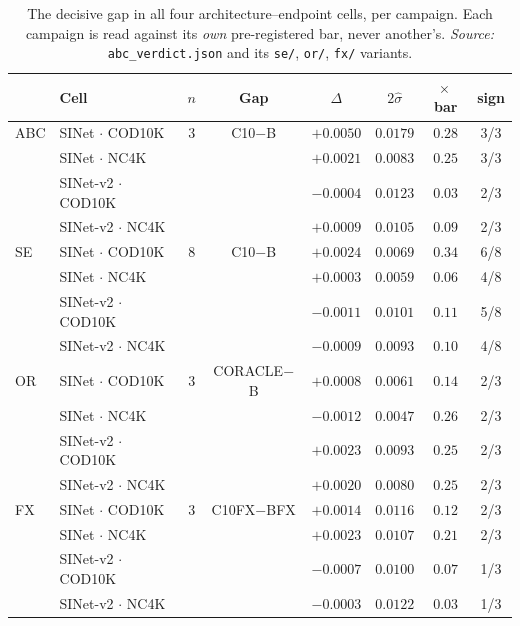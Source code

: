 \documentclass{article} %
\begin{document}
\begin{table}[h]
\caption{The decisive gap in all four architecture--endpoint cells, per campaign. Each campaign is
read against its \emph{own} pre-registered bar, never another's. \emph{Source:}
\texttt{abc\_verdict.json} and its \texttt{se/}, \texttt{or/}, \texttt{fx/} variants.}
\label{tab:allcells}
\begin{center}
\small
\begin{tabular}{@{}llcccccc@{}}
\toprule
& Cell & $n$ & Gap & $\Delta$ & $2\hat{\sigma}$ & $\times$\,bar & sign \\
\midrule
ABC & SINet $\cdot$ COD10K & 3 & C10$-$B & $+0.0050$ & $0.0179$ & $0.28$ & 3/3 \\
 & SINet $\cdot$ NC4K &  &  & $+0.0021$ & $0.0083$ & $0.25$ & 3/3 \\
 & SINet-v2 $\cdot$ COD10K &  &  & $-0.0004$ & $0.0123$ & $0.03$ & 2/3 \\
 & SINet-v2 $\cdot$ NC4K &  &  & $+0.0009$ & $0.0105$ & $0.09$ & 2/3 \\
\midrule
SE & SINet $\cdot$ COD10K & 8 & C10$-$B & $+0.0024$ & $0.0069$ & $0.34$ & 6/8 \\
 & SINet $\cdot$ NC4K &  &  & $+0.0003$ & $0.0059$ & $0.06$ & 4/8 \\
 & SINet-v2 $\cdot$ COD10K &  &  & $-0.0011$ & $0.0101$ & $0.11$ & 5/8 \\
 & SINet-v2 $\cdot$ NC4K &  &  & $-0.0009$ & $0.0093$ & $0.10$ & 4/8 \\
\midrule
OR & SINet $\cdot$ COD10K & 3 & CORACLE$-$B & $+0.0008$ & $0.0061$ & $0.14$ & 2/3 \\
 & SINet $\cdot$ NC4K &  &  & $-0.0012$ & $0.0047$ & $0.26$ & 2/3 \\
 & SINet-v2 $\cdot$ COD10K &  &  & $+0.0023$ & $0.0093$ & $0.25$ & 2/3 \\
 & SINet-v2 $\cdot$ NC4K &  &  & $+0.0020$ & $0.0080$ & $0.25$ & 2/3 \\
\midrule
FX & SINet $\cdot$ COD10K & 3 & C10FX$-$BFX & $+0.0014$ & $0.0116$ & $0.12$ & 2/3 \\
 & SINet $\cdot$ NC4K &  &  & $+0.0023$ & $0.0107$ & $0.21$ & 2/3 \\
 & SINet-v2 $\cdot$ COD10K &  &  & $-0.0007$ & $0.0100$ & $0.07$ & 1/3 \\
 & SINet-v2 $\cdot$ NC4K &  &  & $-0.0003$ & $0.0122$ & $0.03$ & 1/3 \\
\bottomrule
\end{tabular}
\end{center}
\end{table}
\end{document}
